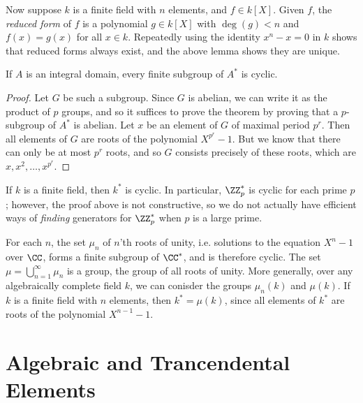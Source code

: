Now suppose $k$ is a finite field with $n$ elements, and $f \in k[X]$. Given $f$, the \emph{reduced form} of $f$ is a polynomial $g \in k[X]$ with $\deg(g) < n$ and $f(x) = g(x)$ for all $x \in k$. Repeatedly using the identity $x^n - x = 0$ in $k$ shows that reduced forms always exist, and the above lemma shows they are unique.

\begin{theorem}
    If $A$ is an integral domain, every finite subgroup of $A^*$ is cyclic.
\end{theorem}
\begin{proof}
    Let $G$ be such a subgroup. Since $G$ is abelian, we can write it as the product of $p$ groups, and so it suffices to prove the theorem by proving that a $p$-subgroup of $A^*$ is abelian. Let $x$ be an element of $G$ of maximal period $p^r$. Then all elements of $G$ are roots of the polynomial $X^{p^r} - 1$. But we know that there can only be at most $p^r$ roots, and so $G$ consists precisely of these roots, which are $x, x^2, \dots, x^{p^r}$.
\end{proof}

\begin{example}
    If $k$ is a finite field, then $k^*$ is cyclic. In particular, $\ZZ_p^*$ is cyclic for each prime $p$; however, the proof above is not constructive, so we do not actually have efficient ways of \emph{finding} generators for $\ZZ_p^*$ when $p$ is a large prime.
 \end{example}

 \begin{example}
    For each $n$, the set $\mu_n$ of $n$'th roots of unity, i.e. solutions to the equation $X^n - 1$ over $\CC$, forms a finite subgroup of $\CC^*$, and is therefore cyclic. The set $\mu = \bigcup_{n = 1}^\infty \mu_n$ is a group, the group of all roots of unity. More generally, over any algebraically complete field $k$, we can conisder the groups $\mu_n(k)$ and $\mu(k)$. If $k$ is a finite field with $n$ elements, then $k^* = \mu(k)$, since all elements of $k^*$ are roots of the polynomial $X^{n-1} - 1$.
\end{example}

\section{Algebraic and Trancendental Elements}

